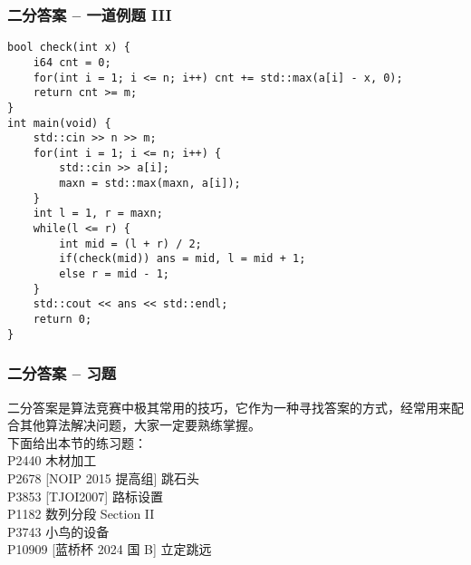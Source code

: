 \documentclass{beamer}
\begin{document}
\begin{frame}[fragile]
\frametitle{二分答案 -- 一道例题 III}
\begin{onlyenv}
\begin{verbatim}
bool check(int x) {
    i64 cnt = 0;
    for(int i = 1; i <= n; i++) cnt += std::max(a[i] - x, 0);
    return cnt >= m;
}
int main(void) {
    std::cin >> n >> m;
    for(int i = 1; i <= n; i++) {
        std::cin >> a[i];
        maxn = std::max(maxn, a[i]);
    }
    int l = 1, r = maxn;
    while(l <= r) {
        int mid = (l + r) / 2;
        if(check(mid)) ans = mid, l = mid + 1;
        else r = mid - 1;
    }
    std::cout << ans << std::endl;
    return 0;
}
\end{verbatim}
\end{onlyenv}
\end{frame}
\begin{frame}
\frametitle{二分答案 -- 习题}
二分答案是算法竞赛中极其常用的技巧，它作为一种寻找答案的方式，经常用来配合其他算法解决问题，大家一定要熟练掌握。\\ 
下面给出本节的练习题：\\ 
P2440	木材加工 	\\
P2678	[NOIP 2015 提高组] 跳石头 \\
P3853	[TJOI2007] 路标设置 \\
P1182	数列分段 Section II \\
P3743	小鸟的设备 \\
P10909 [蓝桥杯 2024 国 B] 立定跳远 \\
\end{frame}
\end{document}
